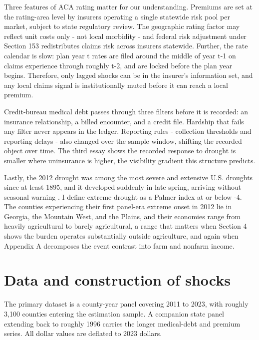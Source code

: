 \documentclass[a4paper,11pt]{report}
\begin{document}
Three features of ACA rating matter for our understanding. Premiums are set at the rating-area level by insurers operating a single statewide risk pool per market, subject to state regulatory review. The geographic rating factor may reflect unit costs only - not local morbidity - and federal risk adjustment under Section 153 redistributes claims risk across insurers statewide. Further, the rate calendar is slow: plan year t rates are filed around the middle of year t-1 on claims experience through roughly t-2, and are locked before the plan year begins. Therefore, only lagged shocks can be in the insurer's information set, and any local claims signal is institutionally muted before it can reach a local premium.

Credit-bureau medical debt passes through three filters before it is recorded: an insurance relationship, a billed encounter, and a credit file. Hardship that fails any filter never appears in the ledger. Reporting rules - collection thresholds and reporting delays - also changed over the sample window, shifting the recorded object over time. The third essay shows the recorded response to drought is smaller where uninsurance is higher, the visibility gradient this structure predicts.

Lastly, the 2012 drought was among the most severe and extensive U.S. droughts since at least 1895, and it developed suddenly in late spring, arriving without seasonal warning \citep{hoerling2014drought}. I define extreme drought as a Palmer index at or below -4. The counties experiencing their first panel-era extreme onset in 2012 lie in Georgia, the Mountain West, and the Plains, and their economies range from heavily agricultural to barely agricultural, a range that matters when Section 4 shows the burden operates substantially outside agriculture, and again when Appendix A decomposes the event contrast into farm and nonfarm income.

\FloatBarrier
\section{Data and construction of shocks}

The primary dataset is a county-year panel covering 2011 to 2023, with roughly 3,100 counties entering the estimation sample. A companion state panel extending back to roughly 1996 carries the longer medical-debt and premium series. All dollar values are deflated to 2023 dollars.
\end{document}
